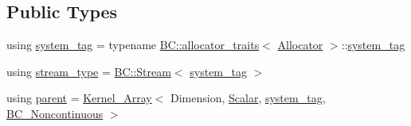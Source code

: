\subsection*{Public Types}
\begin{DoxyCompactItemize}
\item 
using \hyperlink{structBC_1_1tensors_1_1exprs_1_1Array__Const__View_aafde0c1500b6b71d2d964f04b55266a1}{system\+\_\+tag} = typename \hyperlink{namespaceBC_a702bcffa3526460ac93fb2a315f2f7c7}{B\+C\+::allocator\+\_\+traits}$<$ \hyperlink{namespaceBC_a934f94b17b06290e6b241e5f59930c5f}{Allocator} $>$\+::\hyperlink{structBC_1_1tensors_1_1exprs_1_1Array__Const__View_aafde0c1500b6b71d2d964f04b55266a1}{system\+\_\+tag}
\item 
using \hyperlink{structBC_1_1tensors_1_1exprs_1_1Array__Const__View_a8bb694230cd6fd0ff0f5b5cbe667614a}{stream\+\_\+type} = \hyperlink{namespaceBC_abc64a63cd29a22d102a68f478dfd588d}{B\+C\+::\+Stream}$<$ \hyperlink{structBC_1_1tensors_1_1exprs_1_1Array__Const__View_aafde0c1500b6b71d2d964f04b55266a1}{system\+\_\+tag} $>$
\item 
using \hyperlink{structBC_1_1tensors_1_1exprs_1_1Array__Const__View_ab5bec1e932c07d5980709326ea33c680}{parent} = \hyperlink{structBC_1_1tensors_1_1exprs_1_1Kernel__Array}{Kernel\+\_\+\+Array}$<$ Dimension, \hyperlink{namespaceBC_1_1tensors_1_1common__using_a22de9a173f6aa6b07a3b4f543c9ad5c1}{Scalar}, \hyperlink{structBC_1_1tensors_1_1exprs_1_1Array__Const__View_aafde0c1500b6b71d2d964f04b55266a1}{system\+\_\+tag}, \hyperlink{classBC_1_1tensors_1_1exprs_1_1BC__Noncontinuous}{B\+C\+\_\+\+Noncontinuous} $>$
\end{DoxyCompactItemize}
